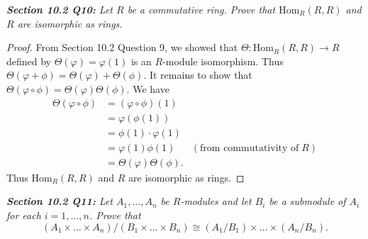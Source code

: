 \documentclass{article}
\begin{document}
\it \textbf{Section 10.2 Q10:} Let $R$ be a commutative ring. Prove that
  $\text{Hom}_R(R,R)$ and $R$ are isomorphic as rings.

  \begin{proof}
    From Section 10.2 Question 9, we showed that
    $\Theta:\text{Hom}_R(R,R)\rightarrow R$ defined by
    $\Theta(\varphi)=\varphi(1)$ is an $R$-module isomorphism. Thus
    $\Theta(\varphi+\phi)=\Theta(\varphi)+\Theta(\phi)$. It remains to show
    that $\Theta(\varphi\circ\phi)=\Theta(\varphi)\Theta(\phi)$. We have
    \begin{align*}
      \Theta(\varphi\circ\phi) &=(\varphi\circ\phi)(1) \\
      &=\varphi(\phi(1)) \\
      &=\phi(1)\cdot\varphi(1) \\
      &=\varphi(1)\phi(1) &(\text{from commutativity of}\; R) \\
      &=\Theta(\varphi)\Theta(\phi).
    \end{align*}
    Thus $\text{Hom}_R(R,R)$ and $R$ are
    isomorphic as rings.
  \end{proof}

\it \textbf{Section 10.2 Q11:} Let $A_1,\ldots,A_n$ be $R$-modules and let
  $B_i$ be a submodule of $A_i$ for each $i=1,\ldots,n$. Prove that
  \[(A_1\times\ldots\times A_n)/(B_1\times\ldots\times B_n)
  \cong(A_1/B_1)\times\ldots\times(A_n/B_n).\]
\end{document}

